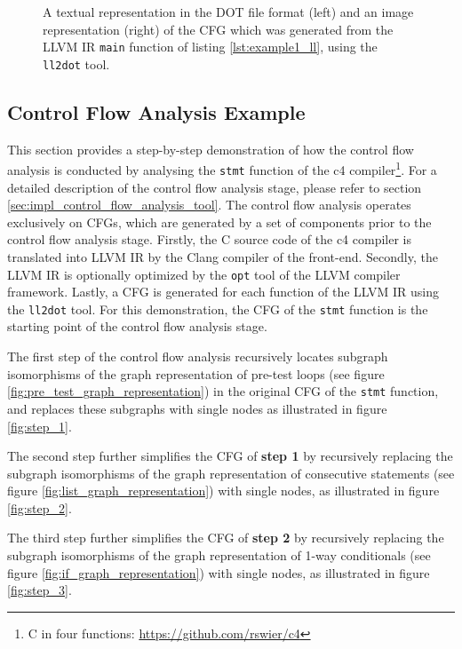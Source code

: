 \begin{figure}[htbp]
\begin{subfigure}[ht]{0.20\textwidth}
	\end{subfigure}
	\caption{A textual representation in the DOT file format (left) and an image representation (right) of the CFG which was generated from the LLVM IR \texttt{main} function of listing \ref{lst:example1_ll}, using the \texttt{ll2dot} tool.}
	\label{fig:example1_cfg}
\end{figure}

\clearpage


\subsection{Control Flow Analysis Example}
\label{app:control_flow_analysis_example}

This section provides a step-by-step demonstration of how the control flow analysis is conducted by analysing the \texttt{stmt} function of the c4 compiler\footnote{C in four functions: \url{https://github.com/rswier/c4}}. For a detailed description of the control flow analysis stage, please refer to section \ref{sec:impl_control_flow_analysis_tool}. The control flow analysis operates exclusively on CFGs, which are generated by a set of components prior to the control flow analysis stage. Firstly, the C source code of the c4 compiler is translated into LLVM IR by the Clang compiler of the front-end. Secondly, the LLVM IR is optionally optimized by the \texttt{opt} tool of the LLVM compiler framework. Lastly, a CFG is generated for each function of the LLVM IR using the \texttt{ll2dot} tool. For this demonstration, the CFG of the \texttt{stmt} function is the starting point of the control flow analysis stage.

The first step of the control flow analysis recursively locates subgraph isomorphisms of the graph representation of pre-test loops (see figure \ref{fig:pre_test_graph_representation}) in the original CFG of the \texttt{stmt} function, and replaces these subgraphs with single nodes as illustrated in figure \ref{fig:step_1}.

The second step further simplifies the CFG of \textbf{step 1} by recursively replacing the subgraph isomorphisms of the graph representation of consecutive statements (see figure \ref{fig:list_graph_representation}) with single nodes, as illustrated in figure \ref{fig:step_2}.

The third step further simplifies the CFG of \textbf{step 2} by recursively replacing the subgraph isomorphisms of the graph representation of 1-way conditionals (see figure \ref{fig:if_graph_representation}) with single nodes, as illustrated in figure \ref{fig:step_3}.

